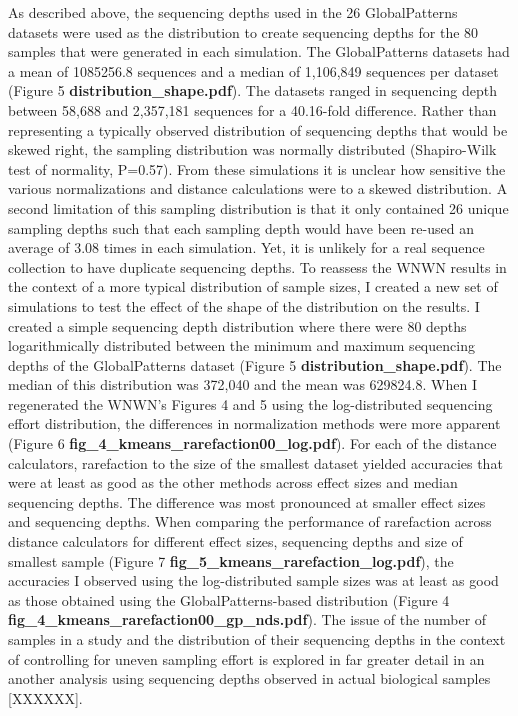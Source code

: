 \documentclass[
]{article}
\begin{document}
As described above, the sequencing depths used in the 26 GlobalPatterns
datasets were used as the distribution to create sequencing depths for
the 80 samples that were generated in each simulation. The
GlobalPatterns datasets had a mean of 1085256.8 sequences and a median
of 1,106,849 sequences per dataset (Figure 5
\textbf{distribution\_shape.pdf}). The datasets ranged in sequencing
depth between 58,688 and 2,357,181 sequences for a 40.16-fold
difference. Rather than representing a typically observed distribution
of sequencing depths that would be skewed right, the sampling
distribution was normally distributed (Shapiro-Wilk test of normality,
P=0.57). From these simulations it is unclear how sensitive the various
normalizations and distance calculations were to a skewed distribution.
A second limitation of this sampling distribution is that it only
contained 26 unique sampling depths such that each sampling depth would
have been re-used an average of 3.08 times in each simulation. Yet, it
is unlikely for a real sequence collection to have duplicate sequencing
depths. To reassess the WNWN results in the context of a more typical
distribution of sample sizes, I created a new set of simulations to test
the effect of the shape of the distribution on the results. I created a
simple sequencing depth distribution where there were 80 depths
logarithmically distributed between the minimum and maximum sequencing
depths of the GlobalPatterns dataset (Figure 5
\textbf{distribution\_shape.pdf}). The median of this distribution was
372,040 and the mean was 629824.8. When I regenerated the WNWN's Figures
4 and 5 using the log-distributed sequencing effort distribution, the
differences in normalization methods were more apparent (Figure 6
\textbf{fig\_4\_kmeans\_rarefaction00\_log.pdf}). For each of the
distance calculators, rarefaction to the size of the smallest dataset
yielded accuracies that were at least as good as the other methods
across effect sizes and median sequencing depths. The difference was
most pronounced at smaller effect sizes and sequencing depths. When
comparing the performance of rarefaction across distance calculators for
different effect sizes, sequencing depths and size of smallest sample
(Figure 7 \textbf{fig\_5\_kmeans\_rarefaction\_log.pdf}), the accuracies
I observed using the log-distributed sample sizes was at least as good
as those obtained using the GlobalPatterns-based distribution (Figure 4
\textbf{fig\_4\_kmeans\_rarefaction00\_gp\_nds.pdf}). The issue of the
number of samples in a study and the distribution of their sequencing
depths in the context of controlling for uneven sampling effort is
explored in far greater detail in an another analysis using sequencing
depths observed in actual biological samples {[}XXXXXX{]}.
\end{document}
